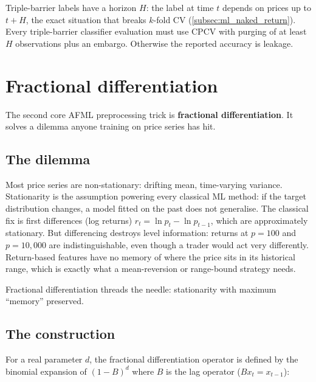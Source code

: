 \begin{pitfallbox}
Triple-barrier labels have a horizon $H$: the label at time $t$
depends on prices up to $t + H$, the exact situation that
breaks $k$-fold CV (\cref{subsec:ml_naked_return}). Every
triple-barrier classifier evaluation must use CPCV with purging
of at least $H$ observations plus an embargo. Otherwise the
reported accuracy is leakage.
\end{pitfallbox}

\section{Fractional differentiation}
\label{sec:ml_fracdiff}

The second core AFML preprocessing trick is \textbf{fractional
differentiation}. It solves a dilemma anyone training on price
series has hit.

\subsection{The dilemma}
\label{subsec:ml_fracdiff_dilemma}

Most price series are non-stationary: drifting mean, time-varying
variance. Stationarity is the assumption powering every classical
ML method: if the target distribution changes, a model fitted on
the past does not generalise. The classical fix is first differences
(log returns) $r_t = \ln p_t - \ln p_{t-1}$, which are approximately
stationary. But differencing destroys level information: returns at
$p = 100$ and $p = 10{,}000$ are indistinguishable, even though a
trader would act very differently. Return-based features have no
memory of where the price sits in its historical range, which is
exactly what a mean-reversion or range-bound strategy needs.

Fractional differentiation threads the needle: stationarity with
maximum ``memory'' preserved.

\subsection{The construction}
\label{subsec:ml_fracdiff_construction}

For a real parameter $d$, the fractional differentiation operator
is defined by the binomial expansion of $(1 - B)^d$ where $B$ is
the lag operator ($B x_t = x_{t-1}$):

